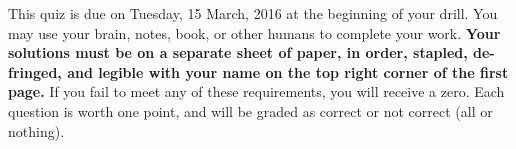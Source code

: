 \documentclass[12pt]{article}
\title{%
	}
\author{}
\date{}
\begin{document}
\maketitle

\vspace{-7pc}
 This quiz is due on Tuesday, 15 March, 2016 at the beginning of your drill.  You may use your brain, notes, book, or other humans to complete your work.  \textbf{Your solutions must be on a separate sheet of paper, in order, stapled, de-fringed, and legible with your name on the top right corner of the first page.}  If you fail to meet any of these requirements, you will receive a zero.  Each question is worth one point, and will be graded as correct or not correct (all or nothing).

\noindent\hrulefill
\end{document}
